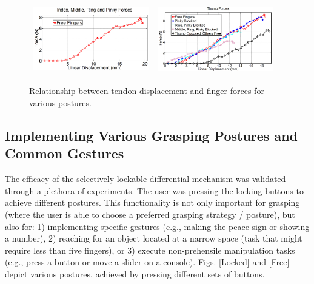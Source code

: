 \begin{figure}[h]
\begin{tabular}{ c c c }
\includegraphics[scale=0.22]{figures/paper_images/fingersforces.jpg} & 
\includegraphics[scale=0.22]{figures/paper_images/thumbforces.jpg}
\end{tabular}
\caption{Relationship between tendon displacement and finger forces for various postures.} 
\label{forcedisplacement}
\end{figure}

\subsection{Implementing Various Grasping Postures and Common Gestures}

The efficacy of the selectively lockable differential mechanism was validated through a plethora of experiments.  The user was pressing the locking buttons to achieve different postures. This functionality is not only important for grasping (where the user is able to choose a preferred grasping strategy / posture), but also for: 1) implementing specific gestures (e.g., making the peace sign or showing a number), 2) reaching for an object located at a narrow space (task that might require less than five fingers), or 3) execute non-prehensile manipulation tasks (e.g., press a button or move a slider on a console). Figs. \ref{Locked} and \ref{Free} depict various postures, achieved by pressing different sets of buttons. 

